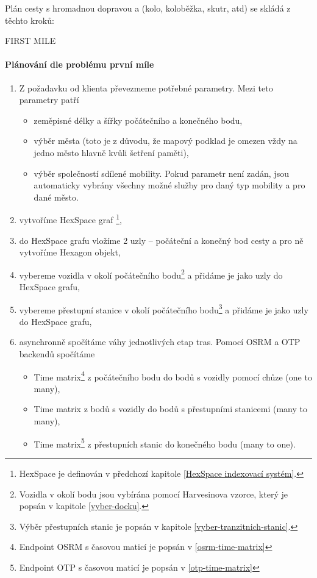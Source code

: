 \documentclass[thesis=M,czech]{FITthesis}[2019/12/23]
\theoremstyle{plain}
\theoremstyle{definition}
\begin{document}
Plán cesty s hromadnou dopravou a (kolo, koloběžka, skutr, atd) se skládá z těchto kroků:

FIRST MILE

\paragraph{Plánování dle problému první míle}

\begin{enumerate}
	\item Z požadavku od klienta převezmeme potřebné parametry. Mezi teto parametry patří
	\begin{itemize}
		\item zeměpisné délky a šířky počátečního a konečného bodu,
		\item výběr města (toto je z důvodu, že mapový podklad je omezen vždy na jedno město hlavně kvůli šetření paměti),
		\item výběr společností sdílené mobility. Pokud parametr není zadán, jsou automaticky vybrány všechny možné služby pro daný typ mobility a pro dané město.
	\end{itemize}
	\item vytvoříme HexSpace graf \footnote{HexSpace je definován v předchozí kapitole \ref{HexSpace indexovací systém}.},
	\item do HexSpace grafu vložíme 2 uzly -- počáteční a konečný bod cesty a pro ně vytvoříme Hexagon objekt,
	\item vybereme vozidla v okolí počátečního bodu\footnote{Vozidla v okolí bodu jsou vybírána pomocí Harvesinova vzorce, který je popsán v kapitole \ref{vyber-docku}.} a přidáme je jako uzly do HexSpace grafu,
	\item vybereme přestupní stanice v okolí počátečního bodu\footnote{Výběr přestupních stanic je popsán v kapitole \ref{vyber-tranzitnich-stanic}.} a přidáme je jako uzly do HexSpace grafu, 
	\item asynchronně spočítáme váhy jednotlivých etap tras. Pomocí OSRM a OTP backendů spočítáme 
	\begin{itemize}
		\item Time matrix\footnote{Endpoint OSRM s časovou maticí je popsán v \ref{osrm-time-matrix}} z počátečního bodu do bodů s vozidly pomocí chůze (one to many),
		\item Time matrix z bodů s vozidly do bodů s přestupními stanicemi (many to many),
		\item Time matrix\footnote{Endpoint OTP s časovou maticí je popsán v \ref{otp-time-matrix}} z přestupních stanic do konečného bodu (many to one).


\end{itemize}
\end{enumerate}
\end{document}
